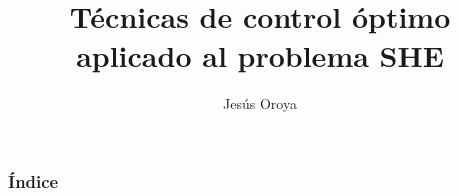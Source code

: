 \documentclass[Berkeley]{beamer}
\title{Técnicas de control óptimo aplicado al problema SHE}
\author{Jesús Oroya}
\institute{Chair of Computational Mathematics}
\begin{document}
    \maketitle
    \begin{frame}
        \frametitle{Índice}
        \tableofcontents    
    \end{frame}


    
    
    

    
\end{document}
